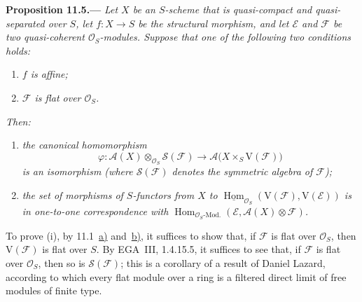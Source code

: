 \medskip
{}\label{prop:sga3-VIB-11.5}%
\noindent\textbf{Proposition 11.5.---}
\emph{Let \(X\) be an \(S\)-scheme that is quasi-compact and
quasi-separated over \(S\), let \(f:X\to S\) be the
structural morphism, and let \(\mathcal E\) and
\(\mathcal F\) be two quasi-coherent
\(\mathcal O_S\)-modules. Suppose that one of the following
two conditions holds:}
\begin{enumerate}
\item[\textup{a)}]\label{concl:sga3-VIB-11.5-a}
  \emph{\(f\) is affine;}

\item[\textup{b)}]\label{concl:sga3-VIB-11.5-b}
  \emph{\(\mathcal F\) is flat over \(\mathcal O_S\).}
\end{enumerate}
\emph{Then:}
\begin{enumerate}
\item[\textup{(i)}]\label{concl:sga3-VIB-11.5-i}
  \emph{the canonical homomorphism}
  \[
    \varphi:\mathcal A(X)\otimes_{\mathcal O_S}\mathcal S(\mathcal F)
      \longrightarrow\mathcal A\bigl(X\times_S\mathrm V(\mathcal F)\bigr)
  \]
  \emph{is an isomorphism \textup{(}where \(\mathcal S(\mathcal F)\) denotes
  the symmetric algebra of \(\mathcal F\)\textup{);}}

\item[\textup{(ii)}]\label{concl:sga3-VIB-11.5-ii}
  \emph{the set of morphisms of \(S\)-functors from \(X\) to
  \(\underline{\operatorname{Hom}}_{\mathcal O_S}(\mathrm V(\mathcal F),\mathrm V(\mathcal E))\)
  is in one-to-one correspondence with
  \(\operatorname{Hom}_{\mathcal O_S\text{-Mod.}}(\mathcal E,\mathcal A(X)\otimes\mathcal F)\).}
\end{enumerate}

To prove \textup{(i)}, by 11.1~\hyperref[concl:sga3-VIB-11.1-a]{\textup{a)}}
and~\hyperref[concl:sga3-VIB-11.1-b]{\textup{b)}}, it suffices to show that, if
\(\mathcal F\) is flat over \(\mathcal O_S\), then \(\mathrm V(\mathcal F)\) is flat
over \(S\). By EGA~III, 1.4.15.5, it suffices to see that, if \(\mathcal F\) is
flat over \(\mathcal O_S\), then so is \(\mathcal S(\mathcal F)\); this is a corollary
of a result of Daniel Lazard, according to which every flat module over a ring is a
filtered direct limit of free modules of finite type.

